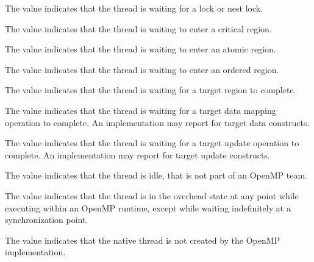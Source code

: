 The value  indicates that the thread is waiting for a  lock  or 
nest lock. 

The value  indicates that the thread is waiting to enter a 
critical region. 

The value  indicates that the thread is waiting to enter an 
atomic region. 

The value  indicates that the thread is waiting to enter an 
ordered region. 


The value  indicates that the thread is waiting for a target 
region to complete.

The value  indicates that the  thread is waiting for a 
target data mapping operation to complete.
An implementation may report  for target data constructs.

The value  indicates that the thread is waiting for a 
target  update operation to complete.
An implementation may report  for target update constructs.

The value  indicates that the thread is idle, that is not part of an 
OpenMP team.

The value  indicates that the thread is in the overhead state at 
any point while executing within an OpenMP runtime, except while waiting indefinitely at 
a synchronization point.

The value  indicates that the native thread is not created by 
the OpenMP implementation.

